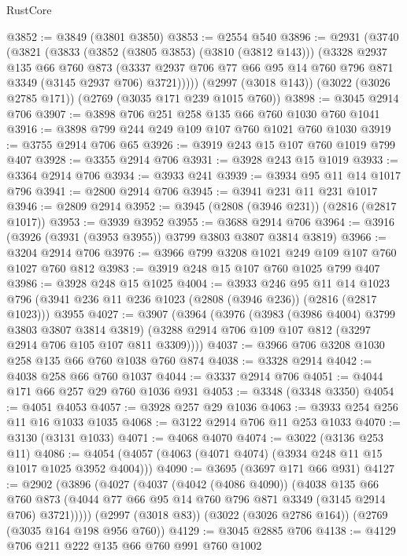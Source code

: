\begin{lexlean}{RustCore}
\begin{coremodule}
@3852 := @3849 (@3801 @3850)
@3853 := @2554 @540
@3896 := @2931
    (@3740
      (@3821
        (@3833
          (@3852 (@3805 @3853) (@3810 (@3812 @143)))
          (@3328
            @2937
            @135
            @66
            @760
            @873
            (@3337 @2937 @706 @77 @66 @95 @14 @760 @796 @871 @3349 (@3145 @2937 @706) @3721)))))
    (@2997 (@3018 @143))
    (@3022 (@3026 @2785 @171))
    (@2769 (@3035 @171 @239 @1015 @760))
@3898 := @3045 @2914 @706
@3907 := @3898 @706 @251 @258 @135 @66 @760 @1030 @760 @1041
@3916 := @3898 @799 @244 @249 @109 @107 @760 @1021 @760 @1030
@3919 := @3755 @2914 @706 @65
@3926 := @3919 @243 @15 @107 @760 @1019 @799 @407
@3928 := @3355 @2914 @706
@3931 := @3928 @243 @15 @1019
@3933 := @3364 @2914 @706
@3934 := @3933 @241
@3939 := @3934 @95 @11 @14 @1017 @796
@3941 := @2800 @2914 @706
@3945 := @3941 @231 @11 @231 @1017
@3946 := @2809 @2914
@3952 := @3945 (@2808 (@3946 @231)) (@2816 (@2817 @1017))
@3953 := @3939 @3952
@3955 := @3688 @2914 @706
@3964 := @3916 (@3926 (@3931 (@3953 @3955)) @3799 @3803 @3807 @3814 @3819)
@3966 := @3204 @2914 @706
@3976 := @3966 @799 @3208 @1021 @249 @109 @107 @760 @1027 @760 @812
@3983 := @3919 @248 @15 @107 @760 @1025 @799 @407
@3986 := @3928 @248 @15 @1025
@4004 := @3933
    @246
    @95
    @11
    @14
    @1023
    @796
    (@3941 @236 @11 @236 @1023 (@2808 (@3946 @236)) (@2816 (@2817 @1023)))
    @3955
@4027 := @3907
    (@3964
      (@3976
        (@3983 (@3986 @4004) @3799 @3803 @3807 @3814 @3819)
        (@3288 @2914 @706 @109 @107 @812 (@3297 @2914 @706 @105 @107 @811 @3309))))
@4037 := @3966 @706 @3208 @1030 @258 @135 @66 @760 @1038 @760 @874
@4038 := @3328 @2914
@4042 := @4038 @258 @66 @760 @1037
@4044 := @3337 @2914 @706
@4051 := @4044 @171 @66 @257 @29 @760 @1036 @931
@4053 := @3348 (@3348 @3350)
@4054 := @4051 @4053
@4057 := @3928 @257 @29 @1036
@4063 := @3933 @254 @256 @11 @16 @1033 @1035
@4068 := @3122 @2914 @706 @11 @253 @1033
@4070 := @3130 (@3131 @1033)
@4071 := @4068 @4070
@4074 := @3022 (@3136 @253 @11)
@4086 := @4054 (@4057 (@4063 (@4071 @4074) (@3934 @248 @11 @15 @1017 @1025 @3952 @4004)))
@4090 := @3695 (@3697 @171 @66 @931)
@4127 := @2902
    (@3896
      (@4027
        (@4037
          (@4042 (@4086 @4090))
          (@4038
            @135
            @66
            @760
            @873
            (@4044 @77 @66 @95 @14 @760 @796 @871 @3349 (@3145 @2914 @706) @3721)))))
    (@2997 (@3018 @83))
    (@3022 (@3026 @2786 @164))
    (@2769 (@3035 @164 @198 @956 @760))
@4129 := @3045 @2885 @706
@4138 := @4129 @706 @211 @222 @135 @66 @760 @991 @760 @1002

\end{coremodule}
\end{lexlean}
